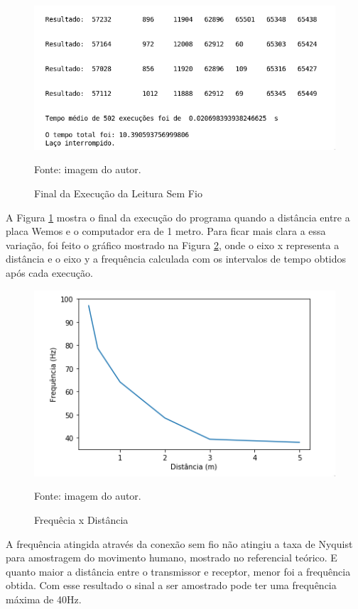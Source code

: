 		\begin{figure}[h]
		\centering
		\includegraphics[keepaspectratio=true,scale=0.6]{figuras/execute_html.png}
		\caption{Final da Execução da Leitura  Sem Fio}
		\footnotesize Fonte: imagem do autor. 
		\label{exechtml}	
	\end{figure}
	
	
	A Figura \ref{exechtml} mostra o final da execução do programa quando a distância entre a placa Wemos e o computador era de 1 metro.  Para ficar mais clara a essa variação, foi feito o gráfico mostrado na Figura \ref{grafico}, onde o eixo x representa a distância e o eixo y a frequência calculada com os intervalos de  tempo obtidos após cada execução.
	
	\begin{figure}[h!]
		\centering
		\includegraphics[keepaspectratio=true,scale=0.8]{figuras/frequenciaXdist.png}
		\caption{Frequêcia x Distância}
		\footnotesize Fonte: imagem do autor. 
		\label{grafico}	
	\end{figure}
	
	A frequência atingida através da conexão sem fio não atingiu a taxa de Nyquist para amostragem do movimento humano, mostrado no referencial teórico. E quanto maior a distância entre o transmissor e receptor, menor foi a frequência obtida. Com esse resultado o sinal a ser amostrado pode ter uma frequência máxima de 40Hz.
	
